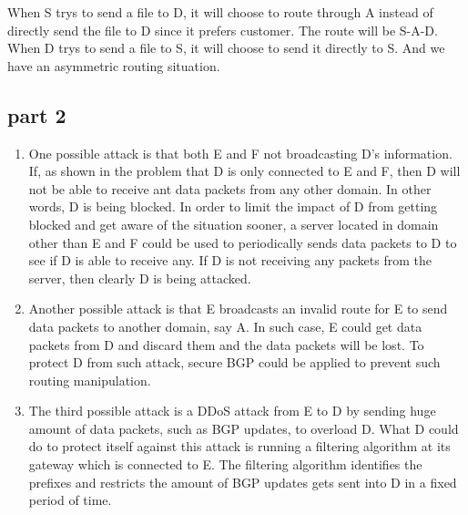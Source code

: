 When S trys to send a file to D, it will choose to route through A instead of directly send the file to D since it prefers customer. The route will be S-A-D. When D trys to send a file to S, it will choose to send it directly to S. And we have an asymmetric routing situation.

\subsection{part 2}

\begin{enumerate}
\item One possible attack is that both E and F not broadcasting D's information. If, as shown in the problem that D is only connected to E and F, then D will not be able to receive ant data packets from any other domain. In other words, D is being blocked. In order to limit the impact of D from getting blocked and get aware of the situation sooner, a server located in domain other than E and F could be used to periodically sends data packets to D to see if D is able to receive any. If D is not receiving any packets from the server, then clearly D is being attacked.
\item Another possible attack is that E broadcasts an invalid route for E to send data packets to another domain, say A. In such case, E could get data packets from D and discard them and the data packets will be lost. To protect D from such attack, secure BGP could be applied to prevent such routing manipulation.
\item The third possible attack is a DDoS attack from E to D by sending huge amount of data packets, such as BGP updates, to overload D. What D could do to protect itself against this attack is running a filtering algorithm at its gateway which is connected to E. The filtering algorithm identifies the prefixes and restricts the amount of BGP updates gets sent into D in a fixed period of time.
\end{enumerate}
